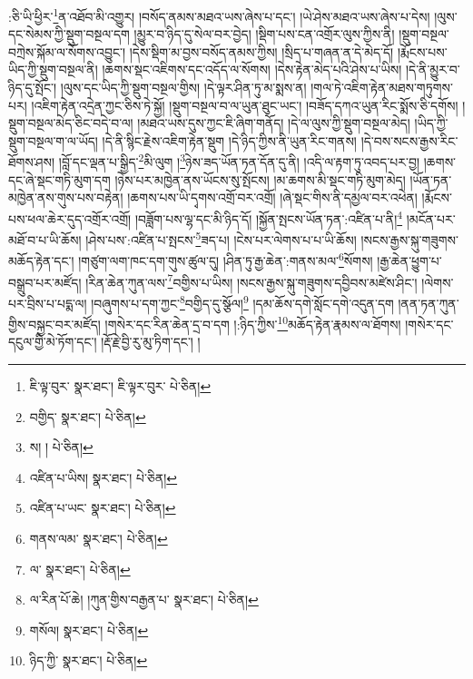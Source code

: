 :ཅི་ཡི་ཕྱིར་\footnote{ཇི་ལྟ་བུར་  སྣར་ཐང་། ཇི་ལྟར་བུར་  པེ་ཅིན། }ན་འཐོབ་མི་འགྱུར། །བསོད་ནམས་མཐའ་ཡས་ཞེས་པ་དང་། །ཡེ་ཤེས་མཐའ་ཡས་ཞེས་པ་དེས། །ལུས་དང་སེམས་ཀྱི་སྡུག་བསྔལ་དག །མྱུར་བ་ཉིད་དུ་སེལ་བར་བྱེད། །སྡིག་པས་ངན་འགྲོར་ལུས་ཀྱིས་ནི། །སྡུག་བསྔལ་བཀྲེས་སྐོམ་ལ་སོགས་འབྱུང་། །དེས་སྡིག་མ་བྱས་བསོད་ནམས་ཀྱིས། །སྲིད་པ་གཞན་ན་དེ་མེད་དོ། །རྨོངས་པས་ཡིད་ཀྱི་སྡུག་བསྔལ་ནི། །ཆགས་སྡང་འཇིགས་དང་འདོད་ལ་སོགས། །དེས་རྟེན་མེད་པའི་ཤེས་པ་ཡིས། །དེ་ནི་མྱུར་བ་ཉིད་དུ་སྤོང་། །ལུས་དང་ཡིད་ཀྱི་སྡུག་བསྔལ་གྱིས། །དེ་ལྟར་ཤིན་ཏུ་མ་སྨས་ན། །གལ་ཏེ་འཇིག་རྟེན་མཐས་གཏུགས་པར། །འཇིག་རྟེན་འདྲེན་ཀྱང་ཅིས་ཏེ་སྐྱོ། །སྡུག་བསྔལ་བ་ལ་ཡུན་ཐུང་ཡང་། །བཟོད་དཀའ་ཡུན་རིང་སྨོས་ཅི་དགོས། །སྡུག་བསྔལ་མེད་ཅིང་བདེ་བ་ལ། །མཐའ་ཡས་དུས་ཀྱང་ཇི་ཞིག་གནོད། །དེ་ལ་ལུས་ཀྱི་སྡུག་བསྔལ་མེད། །ཡིད་ཀྱི་སྡུག་བསྔལ་ག་ལ་ཡོད། །དེ་ནི་སྙིང་རྗེས་འཇིག་རྟེན་སྡུག །དེ་ཉིད་ཀྱིས་ནི་ཡུན་རིང་གནས། །དེ་བས་སངས་རྒྱས་རིང་ཐོགས་ཤས། །བློ་དང་ལྡན་པ་སྒྱིད་\footnote{བགྱིད་  སྣར་ཐང་།  པེ་ཅིན། }མི་ལུག །\footnote{ས། །  པེ་ཅིན། }ཉེས་ཟད་ཡོན་ཏན་དོན་དུ་ནི། །འདི་ལ་རྟག་ཏུ་འབད་པར་བྱ། །ཆགས་དང་ཞེ་སྡང་གཏི་མུག་དག །ཉེས་པར་མཁྱེན་ནས་ཡོངས་སུ་སྤོངས། །མ་ཆགས་མི་སྡང་གཏི་མུག་མེད། །ཡོན་ཏན་མཁྱེན་ནས་གུས་པས་བརྟེན། །ཆགས་པས་ཡི་དྭགས་འགྲོ་བར་འགྲོ། །ཞེ་སྡང་གིས་ནི་དམྱལ་བར་འཕེན། །རྨོངས་པས་ཕལ་ཆེར་དུད་འགྲོར་འགྲོ། །བཟློག་པས་ལྷ་དང་མི་ཉིད་དོ། །སྐྱོན་སྤངས་ཡོན་ཏན་:འཛིན་པ་ནི།\footnote{འཛིན་པ་ཡིས།  སྣར་ཐང་།  པེ་ཅིན། } །མངོན་པར་མཐོ་བ་པ་ཡི་ཆོས། །ཤེས་པས་:འཛིན་པ་སྤངས་\footnote{འཛིན་པ་ཡང་  སྣར་ཐང་།  པེ་ཅིན། }ཟད་པ། །ངེས་པར་ལེགས་པ་པ་ཡི་ཆོས། །སངས་རྒྱས་སྐུ་གཟུགས་མཆོད་རྟེན་དང་། །གཙུག་ལག་ཁང་དག་གུས་ཚུལ་དུ། །ཤིན་ཏུ་རྒྱ་ཆེན་:གནས་མལ་\footnote{གནས་ལམ་  སྣར་ཐང་།  པེ་ཅིན། }སོགས། །རྒྱ་ཆེན་ཕྱུག་པ་བསྒྲུབ་པར་མཛོད། །རིན་ཆེན་ཀུན་ལས་\footnote{ལ་  སྣར་ཐང་།  པེ་ཅིན། }བགྱིས་པ་ཡིས། །སངས་རྒྱས་སྐུ་གཟུགས་དབྱིབས་མཛེས་ཤིང་། །ལེགས་པར་བྲིས་པ་པདྨ་ལ། །བཞུགས་པ་དག་ཀྱང་\footnote{ལ་རིན་པོ་ཆེ། །ཀུན་གྱིས་བརྒྱན་པ་  སྣར་ཐང་།  པེ་ཅིན། }བགྱིད་དུ་སྩོལ།\footnote{གསོལ།  སྣར་ཐང་།  པེ་ཅིན། } །དམ་ཆོས་དགེ་སློང་དགེ་འདུན་དག །ནན་ཏན་ཀུན་གྱིས་བསྐྱང་བར་མཛོད། །གསེར་དང་རིན་ཆེན་དྲ་བ་དག །:ཉིད་ཀྱིས་\footnote{ཉིད་ཀྱི་  སྣར་ཐང་།  པེ་ཅིན། }མཆོད་རྟེན་རྣམས་ལ་ཐོགས། །གསེར་དང་དངུལ་གྱི་མེ་ཏོག་དང་། །རྡོ་རྗེ་བྱི་རུ་མུ་ཏིག་དང་། །

